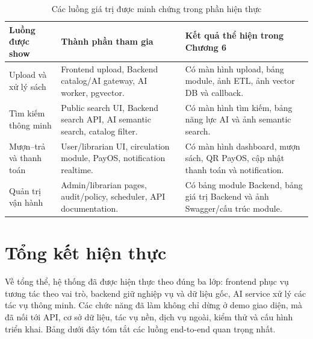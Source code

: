 \begin{table}[H]
\centering
\small
\begin{tabularx}{\textwidth}{|p{3.4cm}|X|p{3.4cm}|}
\hline
\textbf{Luồng được show} & \textbf{Thành phần tham gia} & \textbf{Kết quả thể hiện trong Chương 6} \\
\hline
Upload và xử lý sách &
Frontend upload, Backend catalog/AI gateway, AI worker, pgvector. &
Có màn hình upload, bảng module, ảnh ETL, ảnh vector DB và callback. \\
\hline
Tìm kiếm thông minh &
Public search UI, Backend search API, AI semantic search, catalog filter. &
Có màn hình tìm kiếm, bảng năng lực AI và ảnh semantic search. \\
\hline
Mượn--trả và thanh toán &
User/librarian UI, circulation module, PayOS, notification realtime. &
Có màn hình dashboard, mượn sách, QR PayOS, cập nhật thanh toán và notification. \\
\hline
Quản trị vận hành &
Admin/librarian pages, audit/policy, scheduler, API documentation. &
Có bảng module Backend, bảng giá trị Backend và ảnh Swagger/cấu trúc module. \\
\hline
\end{tabularx}
\caption{Các luồng giá trị được minh chứng trong phần hiện thực}
\label{tab:implementation_value_flows}
\end{table}

\section{Tổng kết hiện thực}

Về tổng thể, hệ thống đã được hiện thực theo đúng ba lớp: frontend phục vụ tương
tác theo vai trò, backend giữ nghiệp vụ và dữ liệu gốc, AI service xử lý các tác
vụ thông minh. Các chức năng đã làm không chỉ dừng ở demo giao diện, mà đã nối
tới API, cơ sở dữ liệu, tác vụ nền, dịch vụ ngoài, kiểm thử và cấu hình triển
khai. Bảng dưới đây tóm tắt các luồng end-to-end quan trọng nhất.

